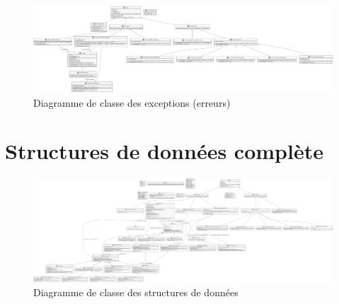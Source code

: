 {	\begin{figure}[H]
		\centerline{
			\includegraphics[width=1.15\textwidth,keepaspectratio]{../diagrams-simplified/class/exceptions/lutin-compiler-class-diagram-exceptions-uml.png}
		}	
		\caption{Diagramme de classe des exceptions (erreurs)}
		\label{fig:erreur-structure}
	\end{figure}		
	
	\section{Structures de données complète}
	\label{sec:full-structure}
	
	\begin{figure}[H]
		\centerline{
			\includegraphics[width=1.15\textwidth,keepaspectratio]{../diagrams/class/lutin-compiler-class-diagram-uml.png}
		}	
		\label{fig:full-structure}
		\caption{Diagramme de classe des structures de données}
	\end{figure}

	\clearpage
	\recalctypearea
}


